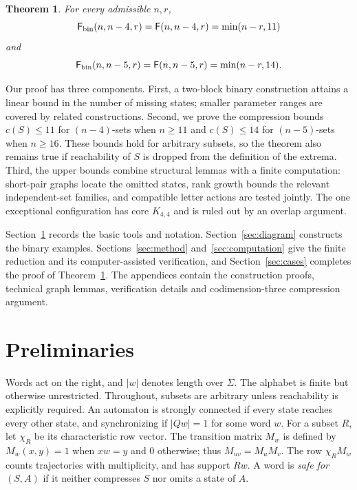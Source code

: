 \documentclass[11pt]{article}
\newtheorem{theorem}{Theorem}
\theoremstyle{definition}
\theoremstyle{plain}
\newcommand{\Max}{\mathsf F}
\begin{document}
\begin{theorem}\label{thm:main}
For every admissible $n,r$,
\[
 \Max_{\rm bin}(n,n-4,r)=\Max(n,n-4,r)=\min(n-r,11)
\]
and
\[
 \Max_{\rm bin}(n,n-5,r)=\Max(n,n-5,r)=\min(n-r,14).
\]
\end{theorem}

Our proof has three components. First, a two-block binary construction
attains a linear bound in the number of missing states; smaller parameter
ranges are covered by related constructions. Second, we prove the
compression bounds $c(S)\le11$ for $(n-4)$-sets when $n\ge11$ and
$c(S)\le14$ for $(n-5)$-sets when $n\ge16$. These bounds hold for
arbitrary subsets, so the theorem also remains true if reachability
of $S$ is dropped from the definition of the extrema. Third, the upper
bounds combine structural lemmas with a finite computation: short-pair
graphs locate the omitted states, rank growth bounds the relevant
independent-set families, and compatible letter actions are tested
jointly. The one exceptional configuration has core $K_{4,4}$ and is
ruled out by an overlap argument.

Section~\ref{sec:prelim} records the basic tools and notation.
Section~\ref{sec:diagram} constructs the binary examples.
Sections~\ref{sec:method} and~\ref{sec:computation} give the finite
reduction and its computer-assisted verification, and
Section~\ref{sec:cases} completes the proof of Theorem~\ref{thm:main}.
The appendices contain the construction proofs, technical graph lemmas,
verification details and codimension-three compression argument.

\section{Preliminaries}\label{sec:prelim}
Words act on the right, and $|w|$ denotes length over $\Sigma$.
The alphabet is finite but otherwise unrestricted. Throughout, subsets
are arbitrary unless reachability is explicitly required. An automaton is strongly
connected if every state reaches every other state, and synchronizing
if $|Qw|=1$ for some word $w$.
For a subset $R$, let $\chi_R$ be its characteristic row vector.
The transition matrix $M_w$ is defined by $M_w(x,y)=1$ when $xw=y$
and $0$ otherwise; thus $M_{uv}=M_uM_v$. The row $\chi_RM_w$
counts trajectories with multiplicity, and has support $Rw$.
A word is \emph{safe for $(S,A)$} if it neither compresses $S$ nor
omits a state of $A$.
\end{document}
